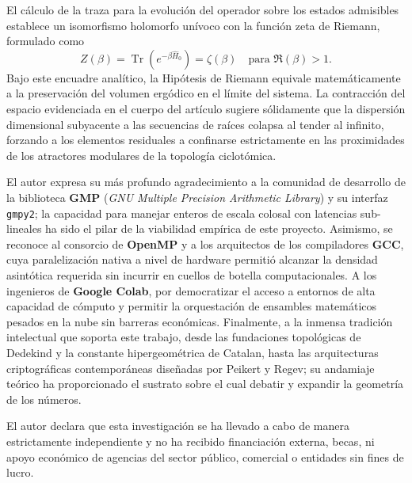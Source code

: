 \documentclass{article}
\numberwithin{equation}{section}
\theoremstyle{plain}
\theoremstyle{definition}
\begin{document}
El cálculo de la traza para la evolución del operador sobre los estados admisibles establece un isomorfismo holomorfo unívoco con la función zeta de Riemann, formulado como
\begin{equation}
    Z(\beta) = \operatorname{Tr}(e^{-\beta \hat{H}_0}) = \zeta(\beta) \quad \text{para } \Re(\beta) > 1.
\end{equation}
Bajo este encuadre analítico, la Hipótesis de Riemann equivale matemáticamente a la preservación del volumen ergódico en el límite del sistema. La contracción del espacio evidenciada en el cuerpo del artículo sugiere sólidamente que la dispersión dimensional subyacente a las secuencias de raíces colapsa al tender al infinito, forzando a los elementos residuales a confinarse estrictamente en las proximidades de los atractores modulares de la topología ciclotómica.


\begin{ack}
El autor expresa su más profundo agradecimiento a la comunidad de desarrollo de la biblioteca \textbf{GMP} (\textit{GNU Multiple Precision Arithmetic Library}) y su interfaz \texttt{gmpy2}; la capacidad para manejar enteros de escala colosal con latencias sub-lineales ha sido el pilar de la viabilidad empírica de este proyecto. Asimismo, se reconoce al consorcio de \textbf{OpenMP} y a los arquitectos de los compiladores \textbf{GCC}, cuya paralelización nativa a nivel de hardware permitió alcanzar la densidad asintótica requerida sin incurrir en cuellos de botella computacionales. A los ingenieros de \textbf{Google Colab}, por democratizar el acceso a entornos de alta capacidad de cómputo y permitir la orquestación de ensambles matemáticos pesados en la nube sin barreras económicas. Finalmente, a la inmensa tradición intelectual que soporta este trabajo, desde las fundaciones topológicas de Dedekind y la constante hipergeométrica de Catalan, hasta las arquitecturas criptográficas contemporáneas diseñadas por Peikert y Regev; su andamiaje teórico ha proporcionado el sustrato sobre el cual debatir y expandir la geometría de los números.
\end{ack}

\begin{funding}
El autor declara que esta investigación se ha llevado a cabo de manera estrictamente independiente y no ha recibido financiación externa, becas, ni apoyo económico de agencias del sector público, comercial o entidades sin fines de lucro.
\end{funding}
\end{document}
